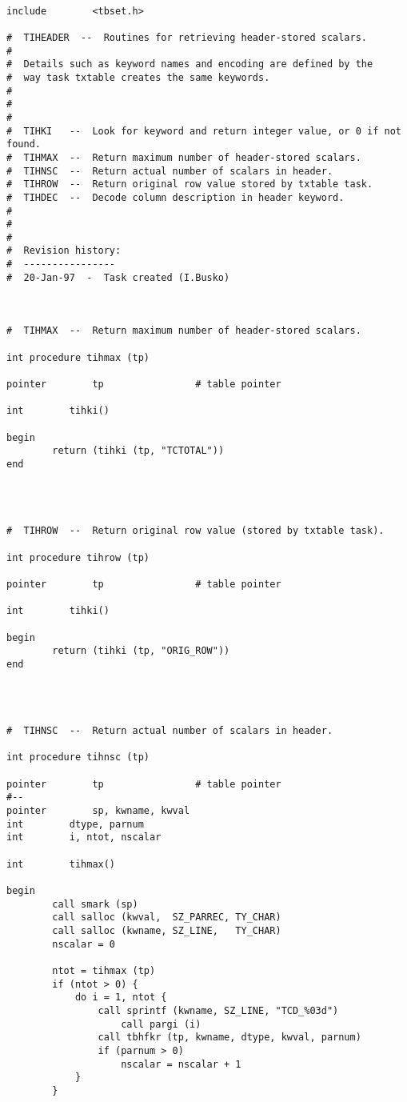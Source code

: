 \begin{verbatim}

include        <tbset.h>

#  TIHEADER  --  Routines for retrieving header-stored scalars.
#
#  Details such as keyword names and encoding are defined by the
#  way task txtable creates the same keywords.
#
#
#
#  TIHKI   --  Look for keyword and return integer value, or 0 if not found.
#  TIHMAX  --  Return maximum number of header-stored scalars.
#  TIHNSC  --  Return actual number of scalars in header.
#  TIHROW  --  Return original row value stored by txtable task.
#  TIHDEC  --  Decode column description in header keyword.
#
#
#
#  Revision history:
#  ----------------
#  20-Jan-97  -  Task created (I.Busko)



#  TIHMAX  --  Return maximum number of header-stored scalars.

int procedure tihmax (tp)

pointer        tp                # table pointer

int        tihki()

begin
        return (tihki (tp, "TCTOTAL"))
end




#  TIHROW  --  Return original row value (stored by txtable task).

int procedure tihrow (tp)

pointer        tp                # table pointer

int        tihki()

begin
        return (tihki (tp, "ORIG_ROW"))
end




#  TIHNSC  --  Return actual number of scalars in header.

int procedure tihnsc (tp)

pointer        tp                # table pointer
#--
pointer        sp, kwname, kwval
int        dtype, parnum
int        i, ntot, nscalar

int        tihmax()

begin
        call smark (sp)
        call salloc (kwval,  SZ_PARREC, TY_CHAR)
        call salloc (kwname, SZ_LINE,   TY_CHAR)
        nscalar = 0

        ntot = tihmax (tp)
        if (ntot > 0) {
            do i = 1, ntot {
                call sprintf (kwname, SZ_LINE, "TCD_%03d")
                    call pargi (i)
                call tbhfkr (tp, kwname, dtype, kwval, parnum)
                if (parnum > 0)
                    nscalar = nscalar + 1
            }
        }


\end{verbatim}

